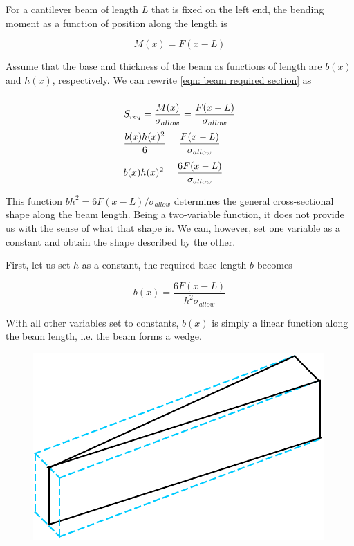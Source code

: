 \documentclass[
10pt,
a4paper,
openany,
svgnames,
]{book}
\begin{document}
\begin{solution}
  For a cantilever beam of length $L$ that is fixed on the left end, the bending moment as a function of position along the length is

  \[M(x) = F(x-L)\]

  Assume that the base and thickness of the beam as functions of length are $b(x)$ and $h(x)$, respectively. We can rewrite \cref{eqn: beam required section} as

  \[{\renewcommand{\arraystretch}{2.5}
  \begin{array}{l}
    S_{req} = \dfrac{M(x)}{\sigma_{allow}} = \dfrac{F(x-L)}{\sigma_{allow}} \\
    \dfrac{b(x)h(x)^2}{6} = \dfrac{F(x-L)}{\sigma_{allow}} \\
    b(x)h(x)^2 = \dfrac{6F(x-L)}{\sigma_{allow}}
  \end{array}}\]

This function $bh^2 = 6F(x-L)/\sigma_{allow}$ determines the general cross-sectional shape along the beam length. Being a two-variable function, it does not provide us with the sense of what that shape is. We can, however, set one variable as a constant and obtain the shape described by the other.

First, let us set $h$ as a constant, the required base length $b$ becomes

\[b(x) = \dfrac{6F(x-L)}{h^2 \sigma_{allow}}\]

With all other variables set to constants, $b(x)$ is simply a linear function along the beam length, i.e. the beam forms a wedge.

\begin{figure}[H]
  \centering
  \includegraphics[scale=0.7]{pictures/Simple-load-bearing/fully-stressed-wedge}
\end{figure}


\end{solution}
\end{document}
